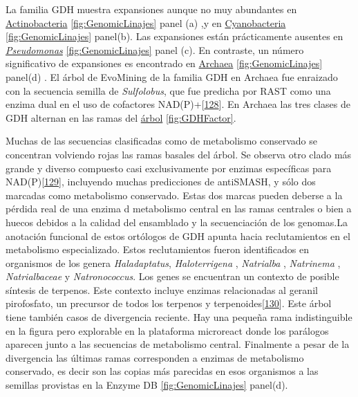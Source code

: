 \documentclass[12pt,twoside]{reedthesis}
\begin{document}
  La familia GDH muestra expansiones aunque no muy abundantes en
  \href{https://microreact.org/project/r1IhjVm6X?tt=cr}{Actinobacteria}
  \autoref{fig:GenomicLinajes} panel (a) ,y en
  \href{https://microreact.org/project/HyjYUN7pQ?tt=cr}{Cyanobacteria}
  \autoref{fig:GenomicLinajes} panel(b). Las expansiones están
  prácticamente ausentes en
  \href{https://microreact.org/project/HyjYUN7pQ?tt=cr}{\emph{Pseudomonas}}
  \autoref{fig:GenomicLinajes} panel (c). En contraste, un número
  significativo de expansiones es encontrado en
  \href{https://microreact.org/project/ByUcvNmaX?tt=cr}{Archaea}
  \autoref{fig:GenomicLinajes} panel(d) . El árbol de EvoMining de la
  familia GDH en Archaea fue enraizado con la secuencia semilla de
  \emph{Sulfolobus}, que fue predicha por RAST como una enzima dual en el
  uso de cofactores
  NAD(P)+{[}\protect\hyperlink{ref-consalvi_glutamate_1991}{128}{]}. En
  Archaea las tres clases de GDH alternan en las ramas del
  \href{https://microreact.org/project/ByUcvNmaX?tt=cr}{árbol}
  \autoref{fig:GDHFactor}.
  
  Muchas de las secuencias clasificadas como de metabolismo conservado se
  concentran volviendo rojas las ramas basales del árbol. Se observa otro
  clado más grande y diverso compuesto casi exclusivamente por enzimas
  específicas para
  NAD(P){[}\protect\hyperlink{ref-ferrer_nadp-glutamate_1996}{129}{]},
  incluyendo muchas predicciones de antiSMASH, y sólo dos marcadas como
  metabolismo conservado. Estas dos marcas pueden deberse a la pérdida
  real de una enzima d metabolismo central en las ramas centrales o bien a
  huecos debidos a la calidad del ensamblado y la secuenciación de los
  genomas.La anotación funcional de estos ortólogos de GDH apunta hacia
  reclutamientos en el metabolismo especializado. Estos reclutamientos
  fueron identificados en organismos de los genera \emph{Haladaptatus},
  \emph{Haloterrigena} , \emph{Natrialba} , \emph{Natrinema} ,
  \emph{Natrialbaceae} y \emph{Natronococcus}. Los genes se encuentran un
  contexto de posible síntesis de terpenos. Este contexto incluye enzimas
  relacionadas al geranil pirofosfato, un precursor de todos los terpenos
  y terpenoides{[}\protect\hyperlink{ref-tholl_terpene_2006}{130}{]}. Este
  árbol tiene también casos de divergencia reciente. Hay una pequeña rama
  indistinguible en la figura pero explorable en la plataforma microreact
  donde los parálogos aparecen junto a las secuencias de metabolismo
  central. Finalmente a pesar de la divergencia las últimas ramas
  corresponden a enzimas de metabolismo conservado, es decir son las
  copias más parecidas en esos organismos a las semillas provistas en la
  Enzyme DB \autoref{fig:GenomicLinajes} panel(d).
  
\end{document}
